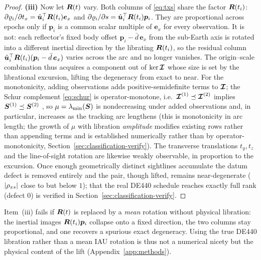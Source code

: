 \begin{proof}
\textbf{(iii)} Now let $\bm{R}(t)$ vary. Both columns of \eqref{eq:txs} share the
factor $\bm{R}(t_i)$: $\partial\varrho_i/\partial t_x=\hat{\bm{u}}_i^\top\bm{R}(t_i)\bm{e}_x$
and $\partial\varrho_i/\partial s=\hat{\bm{u}}_i^\top\bm{R}(t_i)\bm{p}_i$. They are
proportional across epochs only if $\bm{p}_i$ is a common scalar multiple of
$\bm{e}_x$ for every observation. It is not: each reflector's fixed body offset
$\bm{p}_i-\bar d\,\bm{e}_x$ from the sub-Earth axis is rotated into a different
inertial direction by the librating $\bm{R}(t_i)$, so the residual column
$\hat{\bm{u}}_i^\top\bm{R}(t_i)(\bm{p}_i-\bar d\,\bm{e}_x)$ varies across the arc and no
longer vanishes. The origin--scale combination thus acquires a component out of
$\ker\bm{\mathcal{I}}$ whose size is set by the librational excursion, lifting the
degeneracy from exact to near. For the monotonicity, adding observations adds
positive-semidefinite terms to $\bm{\mathcal{I}}$; the Schur complement
\eqref{eq:schur} is operator-monotone, i.e.\ $\bm{\mathcal{I}}^{(1)}\preceq\bm{\mathcal{I}}^{(2)}$
implies $\bm{S}^{(1)}\preceq\bm{S}^{(2)}$ \citep{zhang2005schur,hornjohnson2013matrix},
so $\mu=\lambda_{\min}(\bm{S})$ is nondecreasing under added observations and, in
particular, increases as the tracking arc lengthens (this is monotonicity in arc
length; the growth of $\mu$ with libration \emph{amplitude} modifies existing rows
rather than appending terms and is established numerically rather than by
operator-monotonicity, Section~\ref{sec:classification-verify}). The transverse
translations $t_y,t_z$ and the line-of-sight rotation are likewise weakly
observable, in proportion to the excursion. Once enough geometrically distinct
sightlines accumulate the datum defect is removed entirely and the pair, though
lifted, remains near-degenerate ($|\rho_{x s}|$ close to but below $1$); that the real
DE440 schedule reaches exactly full rank (defect $0$) is verified in
Section~\ref{sec:classification-verify}.
\end{proof}

\begin{remark}
Item~(iii) fails if $\bm{R}(t)$ is replaced by a \emph{mean} rotation without
physical libration: the inertial images $\bm{R}(t_i)\bm{p}_i$ collapse onto a fixed
direction, the two columns stay proportional, and one recovers a spurious exact
degeneracy. Using the true
DE440 libration \citep{park2021de440} rather than a mean IAU rotation is thus not a
numerical nicety but the physical content of the lift (Appendix~\ref{app:methods}).
\end{remark}

